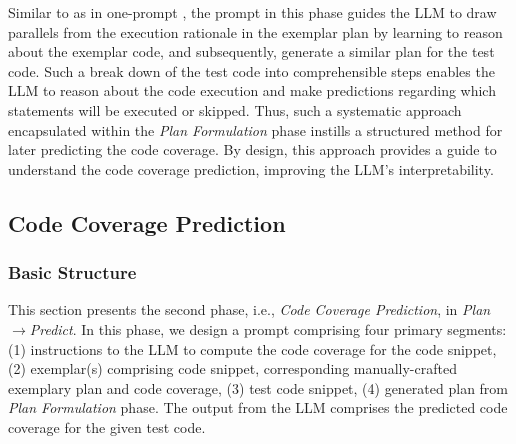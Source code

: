 Similar to as in one-prompt {\tool}, the prompt in this phase guides the LLM to draw parallels from the execution rationale in the exemplar plan by learning to reason about the exemplar code, and subsequently, generate a similar plan for the test code. Such a break down of the test code into comprehensible steps enables the LLM to reason about the code execution and make predictions regarding which statements will be executed or skipped. Thus, such a systematic approach encapsulated within the \textit{Plan Formulation} phase instills a structured method for later predicting the code coverage. By design, this approach provides a guide to understand the code coverage prediction, improving the LLM's interpretability.
%
%
%



\subsection{Code Coverage Prediction}

\subsubsection{Basic Structure}
This section presents the second phase, i.e., \textit{Code Coverage Prediction}, in \textit{Plan} $\xrightarrow{}$\textit{Predict}. In this phase, we design a prompt comprising four primary segments: (1) instructions to the LLM to compute the code coverage for the code snippet, (2) exemplar(s) comprising code snippet, corresponding manually-crafted exemplary plan and code coverage, (3) test code snippet, (4) generated plan from \textit{Plan Formulation} phase. The output from the LLM comprises the predicted code coverage for the given test code.

